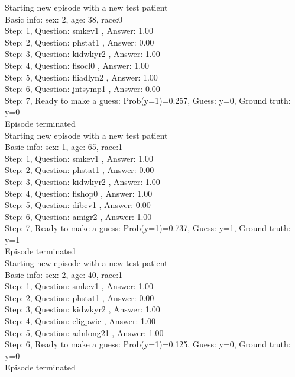 \documentclass[reqno,11pt]{article}
\begin{document}
\noindent Starting new episode with a new test patient \\ [0.5ex] 
Basic info: sex: 2, age: 38, race:0 \\ [0.5ex] 
Step: 1, Question:  smkev1 , Answer: 1.00 \\ [0.5ex] 
Step: 2, Question:  phstat1 , Answer: 0.00 \\ [0.5ex] 
Step: 3, Question:  kidwkyr2 , Answer: 1.00 \\ [0.5ex] 
Step: 4, Question:  flsocl0 , Answer: 1.00 \\ [0.5ex] 
Step: 5, Question:  fliadlyn2 , Answer: 1.00 \\ [0.5ex] 
Step: 6, Question:  jntsymp1 , Answer: 0.00 \\ [0.5ex] 
Step: 7, Ready to make a guess: Prob(y=1)=0.257, Guess: y=0, Ground truth: y=0 \\ [0.5ex] 
Episode terminated \\ [0.5ex] 

Starting new episode with a new test patient \\ [0.5ex] 
Basic info: sex: 1, age: 65, race:1 \\ [0.5ex] 
Step: 1, Question:  smkev1 , Answer: 1.00 \\ [0.5ex] 
Step: 2, Question:  phstat1 , Answer: 0.00 \\ [0.5ex] 
Step: 3, Question:  kidwkyr2 , Answer: 1.00 \\ [0.5ex] 
Step: 4, Question:  flshop0 , Answer: 1.00 \\ [0.5ex] 
Step: 5, Question:  dibev1 , Answer: 0.00 \\ [0.5ex] 
Step: 6, Question:  amigr2 , Answer: 1.00 \\ [0.5ex] 
Step: 7, Ready to make a guess: Prob(y=1)=0.737, Guess: y=1, Ground truth: y=1 \\ [0.5ex] 
Episode terminated \\ [0.5ex] 

\noindent Starting new episode with a new test patient \\ [0.5ex] 
Basic info: sex: 2, age: 40, race:1 \\ [0.5ex] 
Step: 1, Question:  smkev1 , Answer: 1.00 \\ [0.5ex] 
Step: 2, Question:  phstat1 , Answer: 0.00 \\ [0.5ex] 
Step: 3, Question:  kidwkyr2 , Answer: 1.00 \\ [0.5ex] 
Step: 4, Question:  eligpwic , Answer: 1.00 \\ [0.5ex] 
Step: 5, Question:  adnlong21 , Answer: 1.00 \\ [0.5ex] 
Step: 6, Ready to make a guess: Prob(y=1)=0.125, Guess: y=0, Ground truth: y=0 \\ [0.5ex] 
Episode terminated \\ [0.5ex] 
\end{document}
